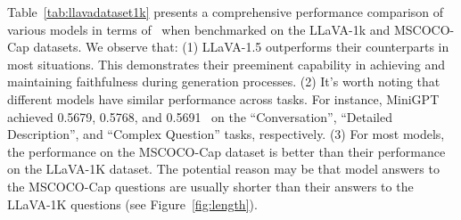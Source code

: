 Table~\ref{tab:llavadataset1k} 
presents a comprehensive performance comparison of various models in terms of \ours\ when benchmarked on the LLaVA-1k and MSCOCO-Cap datasets. We observe that: 
(1) LLaVA-1.5 outperforms their counterparts in most situations. This demonstrates their preeminent capability in achieving and maintaining faithfulness during generation processes. 
(2) It's worth noting that different models have similar performance across tasks. For instance, MiniGPT achieved 0.5679,  0.5768, and 0.5691 \ours\ on the ``Conversation'', ``Detailed Description'', and ``Complex Question'' tasks, respectively. 
(3) For most models, the performance on the MSCOCO-Cap dataset is better than their performance on the LLaVA-1K dataset. The potential reason may be that model answers to the MSCOCO-Cap questions are usually shorter than their answers to the LLaVA-1K questions (see Figure~\ref{fig:length}). 




